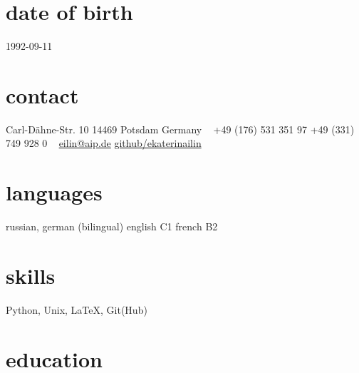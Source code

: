 \documentclass[]{k-cv} %
\begin{document}


\begin{aside} %
\section{date of birth}
\color{gray}1992-09-11
\section{contact}
Carl-D\"ahne-Str. 10
14469 Potsdam
Germany
~
+49 (176) 531 351 97
+49 (331) 749 928 0
~
\href{mailto:eilin@aip.de}{eilin@aip.de}
\href{https://github.com/ekaterinailin}{github/ekaterinailin}
\section{languages}
russian, german (bilingual)
english C1
french B2
\section{skills}
Python, Unix, LaTeX, Git(Hub)
\end{aside}


\section{education}
\end{document}
